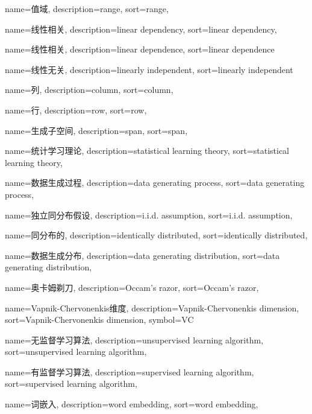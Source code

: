 {
  name=值域,
  description={range},
  sort={range},
}

{
  name=线性相关,
  description={linear dependency},
  sort={linear dependency},
}

{
  name=线性相关,
  description={linear dependence},
  sort={linear dependence}
}

{
  name=线性无关,
  description={linearly independent},
  sort={linearly independent}
}

{
  name=列,
  description={column},
  sort={column},
}

{
  name=行,
  description={row},
  sort={row},
}

{
  name=生成子空间,
  description={span},
  sort={span},
}

{
  name=统计学习理论,
  description={statistical learning theory},
  sort={statistical learning theory},
}

{
  name=数据生成过程,
  description={data generating process},
  sort={data generating process},
}

{
  name=独立同分布假设,
  description={i.i.d. assumption},
  sort={i.i.d. assumption},
}

{
  name=同分布的,
  description={identically distributed},
  sort={identically distributed},
}

{
  name=数据生成分布,
  description={data generating distribution},
  sort={data generating distribution},
}

{
  name=奥卡姆剃刀,
  description={Occam's razor},
  sort={Occam's razor},
}

{
  name=Vapnik-Chervonenkis维度,
  description={Vapnik-Chervonenkis dimension},
  sort={Vapnik-Chervonenkis dimension},
  symbol={VC}
}

{
  name=无监督学习算法,
  description={unsupervised learning algorithm},
  sort={unsupervised learning algorithm},
}

{
  name=有监督学习算法,
  description={supervised learning algorithm},
  sort={supervised learning algorithm},
}

{
  name=词嵌入,
  description={word embedding},
  sort={word embedding},
}

